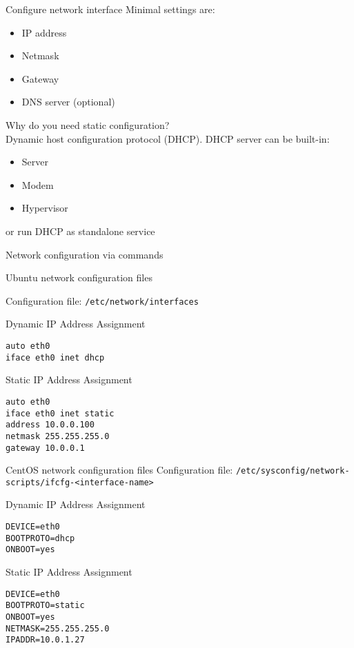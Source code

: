 \begin{frame}{Configure network interface}
Minimal settings are:
  \begin{itemize}
    \item IP address 
    \item Netmask 
	\item Gateway
    \item DNS server (optional)
  \end{itemize}
Why do you need static configuration? \\ 
Dynamic host configuration protocol (DHCP). DHCP server can be built-in:
  \begin{itemize}
	\item Server
    \item Modem 
    \item Hypervisor 
  \end{itemize}
	or run DHCP as standalone service
\end{frame}

\begin{frame}{Network configuration via commands}

\end{frame}

\begin{frame}[fragile]{Ubuntu network configuration files}

Configuration file: {\tt /etc/network/interfaces }

\begin{block}{Dynamic IP Address Assignment}
    \begin{lstlisting}
auto eth0
iface eth0 inet dhcp
    \end{lstlisting}
\end{block}

\begin{block}{Static IP Address Assignment}
    \begin{lstlisting}
auto eth0
iface eth0 inet static
address 10.0.0.100
netmask 255.255.255.0
gateway 10.0.0.1
    \end{lstlisting}
\end{block}
\end{frame}

\begin{frame}[fragile]{CentOS network configuration files}
Configuration file: {\tt /etc/sysconfig/network-scripts/ifcfg-<interface-name> }

\begin{block}{Dynamic IP Address Assignment}
    \begin{lstlisting}
DEVICE=eth0
BOOTPROTO=dhcp
ONBOOT=yes
    \end{lstlisting}
\end{block}

\begin{block}{Static IP Address Assignment}
    \begin{lstlisting}
DEVICE=eth0
BOOTPROTO=static
ONBOOT=yes
NETMASK=255.255.255.0
IPADDR=10.0.1.27
    \end{lstlisting}
\end{block}
\end{frame}

